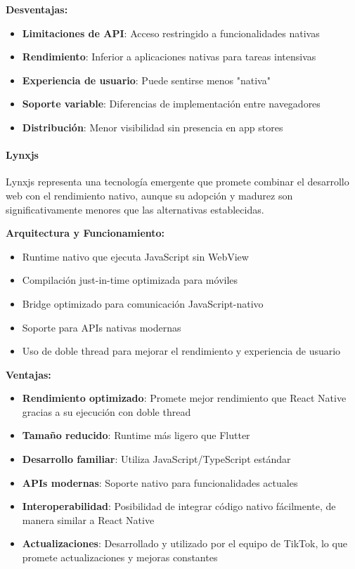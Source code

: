 \textbf{Desventajas:}
\begin{itemize}
    \item \textbf{Limitaciones de API}: Acceso restringido a funcionalidades nativas
    \item \textbf{Rendimiento}: Inferior a aplicaciones nativas para tareas intensivas
    \item \textbf{Experiencia de usuario}: Puede sentirse menos "nativa"
    \item \textbf{Soporte variable}: Diferencias de implementación entre navegadores
    \item \textbf{Distribución}: Menor visibilidad sin presencia en app stores
\end{itemize}

\paragraph{Lynxjs}

Lynxjs representa una tecnología emergente que promete combinar el desarrollo web con el rendimiento nativo, aunque su adopción y madurez son significativamente menores que las alternativas establecidas.

\textbf{Arquitectura y Funcionamiento:}
\begin{itemize}
    \item Runtime nativo que ejecuta JavaScript sin WebView
    \item Compilación just-in-time optimizada para móviles
    \item Bridge optimizado para comunicación JavaScript-nativo
    \item Soporte para APIs nativas modernas
    \item Uso de doble thread para mejorar el rendimiento y experiencia de usuario
\end{itemize}

\textbf{Ventajas:}
\begin{itemize}
    \item \textbf{Rendimiento optimizado}: Promete mejor rendimiento que React Native gracias a su ejecución con doble thread
    \item \textbf{Tamaño reducido}: Runtime más ligero que Flutter
    \item \textbf{Desarrollo familiar}: Utiliza JavaScript/TypeScript estándar
    \item \textbf{APIs modernas}: Soporte nativo para funcionalidades actuales
    \item \textbf{Interoperabilidad}: Posibilidad de integrar código nativo fácilmente, de manera similar a React Native
    \item \textbf{Actualizaciones}: Desarrollado y utilizado por el equipo de TikTok, lo que promete actualizaciones y mejoras constantes
\end{itemize}

